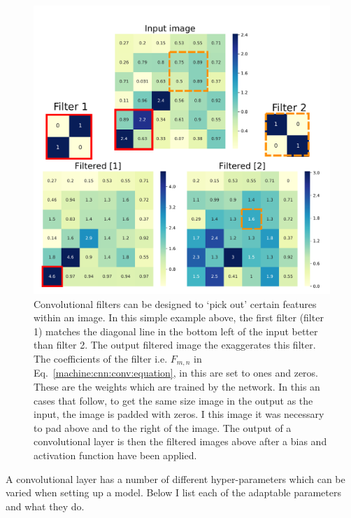 \begin{figure}[p]

    \centering
    \includegraphics[width=\columnwidth]{C4_cnn/conv_filters.pdf}
    \caption{Convolutional filters can be designed to `pick out' certain features within an image. In this simple example above, the first filter (filter 1) matches the diagonal line in the bottom left of the input better than filter 2. The output filtered image the exaggerates this filter. The coefficients of the filter i.e. $F_{m,n}$ in Eq.~\ref{machine:cnn:conv:equation}, in this are set to ones and zeros.
    These are the weights which are trained by the network. In this an cases that follow, to get the same size image in the output as the input, the image is padded with zeros. I this image it was necessary to pad above and to the right of the image. The output of a convolutional layer is then the filtered images above after a bias and activation function have been applied. }
    \label{machine:cnn:convlayer:input}

\end{figure}

A convolutional layer has a number of different hyper-parameters which can be varied when setting up a model.
Below I list each of the adaptable parameters and what they do.

